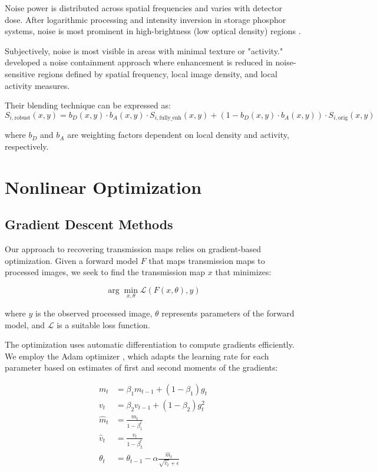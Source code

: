 \documentclass[nomenclature, english, bibtex]{kththesis}
\numberwithin{listing}{chapter}
\begin{document}
Noise power is distributed across spatial frequencies and varies with detector dose. After logarithmic processing and intensity inversion in storage phosphor systems, noise is most prominent in high-brightness (low optical density) regions \cite{hillen1987imaging,ogawa1995quantitative}.

Subjectively, noise is most visible in areas with minimal texture or "activity." \cite{stahl2000digital} developed a noise containment approach where enhancement is reduced in noise-sensitive regions defined by spatial frequency, local image density, and local activity measures.

Their blending technique can be expressed as:
\begin{equation}
S_{i, \text{robust}}(x,y) = b_D(x,y) \cdot b_A(x,y) \cdot S_{i, \text{fully\_enh}}(x,y) + (1 - b_D(x,y) \cdot b_A(x,y)) \cdot S_{i, \text{orig}}(x,y)
\end{equation}

where $b_D$ and $b_A$ are weighting factors dependent on local density and activity, respectively.

\section{Nonlinear Optimization}
\subsection{Gradient Descent Methods}
Our approach to recovering transmission maps relies on gradient-based optimization. Given a forward model $F$ that maps transmission maps to processed images, we seek to find the transmission map $x$ that minimizes:

\begin{equation}
\arg\min_{x, \theta} \mathcal{L}(F(x, \theta), y)
\end{equation}

where $y$ is the observed processed image, $\theta$ represents parameters of the forward model, and $\mathcal{L}$ is a suitable loss function.

The optimization uses automatic differentiation to compute gradients efficiently. We employ the Adam optimizer \cite{kingma2014adam}, which adapts the learning rate for each parameter based on estimates of first and second moments of the gradients:

\begin{align}
m_t &= \beta_1 m_{t-1} + (1 - \beta_1) g_t \\
v_t &= \beta_2 v_{t-1} + (1 - \beta_2) g_t^2 \\
\hat{m}_t &= \frac{m_t}{1 - \beta_1^t} \\
\hat{v}_t &= \frac{v_t}{1 - \beta_2^t} \\
\theta_t &= \theta_{t-1} - \alpha \frac{\hat{m}_t}{\sqrt{\hat{v}_t} + \epsilon}
\end{align}
\end{document}
